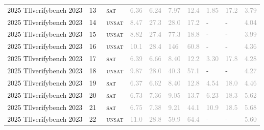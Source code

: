 \begin{center}
{\begin{longtable}{@{}llllllllll@{}}
2025 Tllverifybench 2023 & 13 & ~\textsc{sat} & \textcolor{darkgray}{6.36} & \textcolor{darkgray}{6.24} & \textcolor{darkgray}{7.97} & \textcolor{darkgray}{12.4} & \textcolor{darkgray}{1.85} & \textcolor{darkgray}{17.2} & \textcolor{darkgray}{3.79} \\
2025 Tllverifybench 2023 & 14 & ~\textsc{unsat} & \textcolor{darkgray}{8.47} & \textcolor{darkgray}{27.3} & \textcolor{darkgray}{28.0} & \textcolor{darkgray}{17.2} & - & - & \textcolor{darkgray}{4.04} \\
2025 Tllverifybench 2023 & 15 & ~\textsc{unsat} & \textcolor{darkgray}{8.82} & \textcolor{darkgray}{27.4} & \textcolor{darkgray}{77.3} & \textcolor{darkgray}{18.8} & - & - & \textcolor{darkgray}{3.99} \\
2025 Tllverifybench 2023 & 16 & ~\textsc{unsat} & \textcolor{darkgray}{10.1} & \textcolor{darkgray}{28.4} & \textcolor{darkgray}{146} & \textcolor{darkgray}{60.8} & - & - & \textcolor{darkgray}{4.36} \\
2025 Tllverifybench 2023 & 17 & ~\textsc{sat} & \textcolor{darkgray}{6.39} & \textcolor{darkgray}{6.66} & \textcolor{darkgray}{8.40} & \textcolor{darkgray}{12.2} & \textcolor{darkgray}{3.30} & \textcolor{darkgray}{17.8} & \textcolor{darkgray}{4.28} \\
2025 Tllverifybench 2023 & 18 & ~\textsc{unsat} & \textcolor{darkgray}{9.87} & \textcolor{darkgray}{28.0} & \textcolor{darkgray}{40.3} & \textcolor{darkgray}{57.1} & - & - & \textcolor{darkgray}{4.27} \\
2025 Tllverifybench 2023 & 19 & ~\textsc{sat} & \textcolor{darkgray}{6.37} & \textcolor{darkgray}{6.62} & \textcolor{darkgray}{8.40} & \textcolor{darkgray}{12.8} & \textcolor{darkgray}{4.54} & \textcolor{darkgray}{18.0} & \textcolor{darkgray}{4.46} \\
2025 Tllverifybench 2023 & 20 & ~\textsc{sat} & \textcolor{darkgray}{6.73} & \textcolor{darkgray}{7.36} & \textcolor{darkgray}{9.05} & \textcolor{darkgray}{13.7} & \textcolor{darkgray}{6.23} & \textcolor{darkgray}{18.3} & \textcolor{darkgray}{5.62} \\
2025 Tllverifybench 2023 & 21 & ~\textsc{sat} & \textcolor{darkgray}{6.75} & \textcolor{darkgray}{7.38} & \textcolor{darkgray}{9.21} & \textcolor{darkgray}{44.1} & \textcolor{darkgray}{10.9} & \textcolor{darkgray}{18.5} & \textcolor{darkgray}{5.68} \\
2025 Tllverifybench 2023 & 22 & ~\textsc{unsat} & \textcolor{darkgray}{11.0} & \textcolor{darkgray}{28.8} & \textcolor{darkgray}{59.9} & \textcolor{darkgray}{64.4} & - & - & \textcolor{darkgray}{5.60} \\

\end{longtable}}
\end{center}

